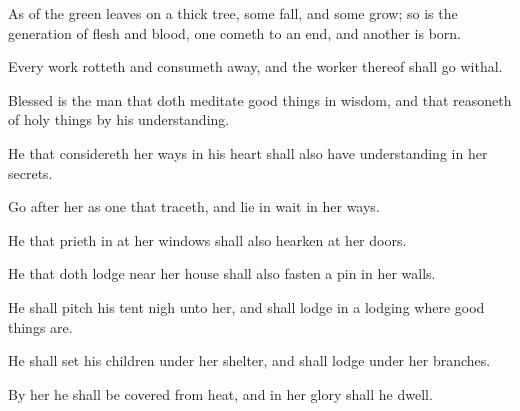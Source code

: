 {\par }{\PP {}As of the green leaves on a thick tree, some fall, and some grow; so is the generation of flesh and blood, one cometh to an end, and another is born.
\par }{\PP {}Every work rotteth and consumeth away, and the worker thereof shall go withal.
\par }{\PP {}Blessed is the man that doth meditate good things in wisdom, and that reasoneth of holy things by his understanding.
\par }{\PP {}He that considereth her ways in his heart shall also have understanding in her secrets.
\par }{\PP {}Go after her as one that traceth, and lie in wait in her ways.
\par }{\PP {}He that prieth in at her windows shall also hearken at her doors.
\par }{\PP {}He that doth lodge near her house shall also fasten a pin in her walls.
\par }{\PP {}He shall pitch his tent nigh unto her, and shall lodge in a lodging where good things are.
\par }{\PP {}He shall set his children under her shelter, and shall lodge under her branches.
\par }{\PP {}By her he shall be covered from heat, and in her glory shall he dwell.

}
